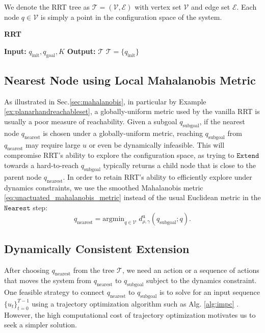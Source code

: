 We denote the RRT tree as $\mathcal{T}=(\mathcal{V},\mathcal{E})$ with vertex set $\mathcal{V}$ and edge set $\mathcal{E}$. Each node $q \in \mathcal{V}$ is simply a point in the configuration space of the system. 


\begin{algorithm}[h]
\caption{\textbf{RRT}}\label{alg:rrt}
\textbf{Input:} $q_{\mathrm{init}}, q_{\mathrm{goal}}, K$\;
\textbf{Output:} $\mathcal{T}$\;
$\mathcal{T} = \{q_{\mathrm{init}}\}$\;
\end{algorithm}


\subsection{Nearest Node using Local Mahalanobis Metric}
As illustrated in Sec.\ref{sec:mahalanobis}, in particular by Example \ref{ex:planarhandreachableset}, a globally-uniform metric used by the vanilla RRT is usually a poor measure of reachability. Given a subgoal $q_{\mathrm{subgoal}}$, if the nearest node $q_{\mathrm{nearest}}$ is chosen under a globally-uniform metric, reaching $q_{\mathrm{subgoal}}$ from $q_{\mathrm{nearest}}$ may require large $u$ or even be dynamically infeasible. This will compromise RRT's ability to explore the configuration space, as trying to $\mathtt{Extend}$ towards a hard-to-reach $q_{\mathrm{subgoal}}$ typically returns a child node that is close to the parent node $q_{\mathrm{nearest}}$. In order to retain RRT's ability to efficiently explore under dynamics constraints, we use the smoothed Mahalanobis metric \eqref{eq:unactuated_mahalanobis_metric} instead of the usual Euclidean metric in the $\mathtt{Nearest}$ step:
\begin{equation}
q_{\mathrm{nearest}} = \text{argmin}_{q \in \mathcal{V}}\; d^{\mathrm{u}}_{\rho,\gamma}(q_{\mathrm{subgoal}}; q).
\end{equation}

\subsection{Dynamically Consistent Extension}
After choosing $q_{\mathrm{nearest}}$ from the tree $\mathcal{T}$, we need an action or a sequence of actions that moves the system from $q_{\mathrm{nearest}}$ to $q_{\mathrm{subgoal}}$ subject to the dynamics constraint. One feasible strategy to connect $q_{\mathrm{nearest}}$ to $q_{\mathrm{subgoal}}$ is to solve for an input sequence $\{u_t\}_{t=0}^{T-1}$ using a trajectory optimization algorithm such as Alg. \ref{alg:impc} \cite{karaman2010optimal}. However, the high computational cost of trajectory optimization motivates us to seek a simpler solution.

